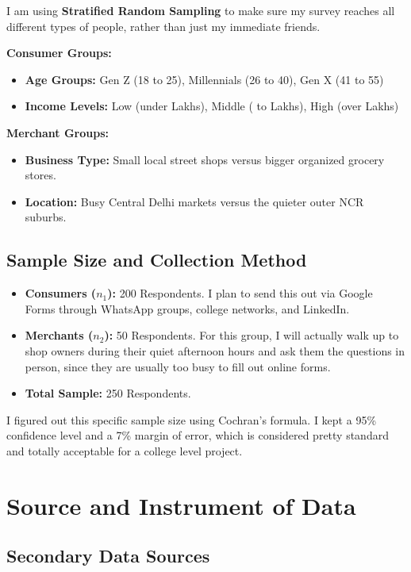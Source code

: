 I am using \textbf{Stratified Random Sampling} to make sure my survey reaches all different types of people, rather than just my immediate friends. 

\textbf{Consumer Groups:}
\begin{itemize}
    \item \textbf{Age Groups:} Gen Z (18 to 25), Millennials (26 to 40), Gen X (41 to 55)
    \item \textbf{Income Levels:} Low (under  Lakhs), Middle ( to  Lakhs), High (over  Lakhs)
\end{itemize}

\textbf{Merchant Groups:}
\begin{itemize}
    \item \textbf{Business Type:} Small local street shops versus bigger organized grocery stores.
    \item \textbf{Location:} Busy Central Delhi markets versus the quieter outer NCR suburbs.
\end{itemize}

\subsection{Sample Size and Collection Method}

\begin{itemize}
    \item \textbf{Consumers ($n_1$):} 200 Respondents. I plan to send this out via Google Forms through WhatsApp groups, college networks, and LinkedIn.
    \item \textbf{Merchants ($n_2$):} 50 Respondents. For this group, I will actually walk up to shop owners during their quiet afternoon hours and ask them the questions in person, since they are usually too busy to fill out online forms.
    \item \textbf{Total Sample:} 250 Respondents.
\end{itemize}

I figured out this specific sample size using Cochran's formula. I kept a 95\% confidence level and a 7\% margin of error, which is considered pretty standard and totally acceptable for a college level project.

\section{Source and Instrument of Data}

\subsection{Secondary Data Sources}

